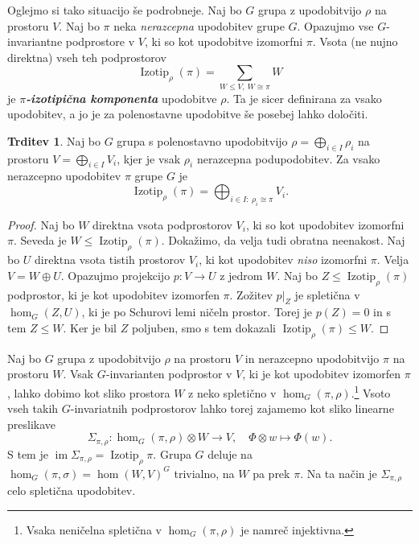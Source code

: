\documentclass[11pt]{book}
\DeclareMathOperator\image{im}
\DeclareMathOperator\Izotip{Izotip}
\def\definicija{\color{rdeca}\bf\em}
\theoremstyle{definition}
\theoremstyle{zgled}
\theoremstyle{odprtproblem}
\theoremstyle{domacanaloga}
\newenvironment{dokaz}
    {\color{siva}\begin{proof}}
    {\end{proof}}
\theoremstyle{izrek}
\newtheorem*{trditev}{Trditev}
\begin{document}
Oglejmo si tako situacijo še podrobneje. Naj bo $G$ grupa z upodobitvijo $\rho$ na prostoru $V$. Naj bo $\pi$ neka \emph{nerazcepna} upodobitev grupe $G$. Opazujmo vse $G$-invariantne podprostore v $V$, ki so kot upodobitve izomorfni $\pi$. Vsota (ne nujno direktna) vseh teh podprostorov
\[
    \textstyle \Izotip_{\rho}(\pi) = \sum_{W \leq V, \ W \cong \pi} W
\]
je {\definicija $\pi$-izotipična komponenta} upodobitve $\rho$. Ta je sicer definirana za vsako upodobitev, a jo je za polenostavne upodobitve še posebej lahko določiti.

\begin{trditev}
Naj bo $G$ grupa s polenostavno upodobitvijo $\rho = \bigoplus_{i \in I} \rho_i$ na prostoru $V = \bigoplus_{i \in I} V_i$, kjer je vsak $\rho_i$ nerazcepna podupodobitev. Za vsako nerazcepno upodobitev $\pi$ grupe $G$ je
\[
    \textstyle \Izotip_{\rho}(\pi) = \bigoplus_{i \in I \colon \ \rho_i \cong \pi} V_i.
\]
\end{trditev}
\begin{dokaz}    
Naj bo $W$ direktna vsota podprostorov $V_i$, ki so kot upodobitev izomorfni $\pi$. Seveda je $W \leq \Izotip_{\rho}(\pi)$. Dokažimo, da velja tudi obratna neenakost. Naj bo $U$ direktna vsota tistih prostorov $V_i$, ki kot upodobitev \emph{niso} izomorfni $\pi$. Velja $V = W \oplus U$. Opazujmo projekcijo $p \colon V \to U$ z jedrom $W$. Naj bo $Z \leq \Izotip_{\rho}(\pi)$ podprostor, ki je kot upodobitev izomorfen $\pi$. Zožitev $p|_Z$ je spletična v $\hom_G(Z, U)$, ki je po Schurovi lemi ničeln prostor. Torej je $p(Z) = 0$ in s tem $Z \leq W$. Ker je bil $Z$ poljuben, smo s tem dokazali $\Izotip_{\rho}(\pi) \leq W$.
\end{dokaz}

Naj bo $G$ grupa z upodobitvijo $\rho$ na prostoru $V$ in nerazcepno upodobitvijo $\pi$ na prostoru $W$. Vsak $G$-invarianten podprostor v $V$, ki je kot upodobitev izomorfen $\pi$, lahko dobimo kot sliko prostora $W$ z neko spletično v $\hom_G(\pi, \rho)$.\footnote{Vsaka neničelna spletična v $\hom_G(\pi, \rho)$ je namreč injektivna.} Vsoto vseh takih $G$-invariatnih podprostorov lahko torej zajamemo kot sliko linearne preslikave
\[
    \Sigma_{\pi, \rho} \colon \hom_G(\pi, \rho) \otimes W \to V, \quad
    \Phi \otimes w \mapsto \Phi(w).
\]
S tem je $\image \Sigma_{\pi, \rho} = \Izotip_{\rho}{\pi}$. Grupa $G$ deluje na $\hom_G(\pi, \sigma) = \hom(W,V)^G$ trivialno, na $W$ pa prek $\pi$. Na ta način je $\Sigma_{\pi, \rho}$ celo spletična upodobitev.
\end{document}

